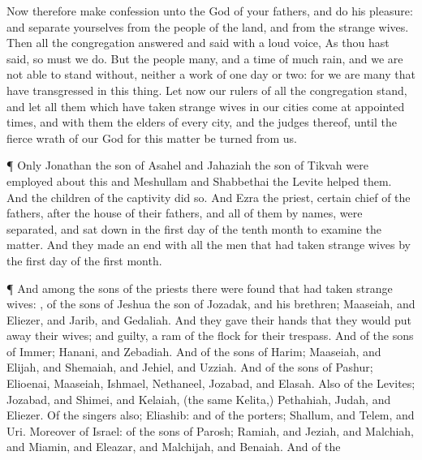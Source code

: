 {Now therefore
make
confession unto the
{}
God of your
fathers, and
do his
pleasure: and
separate yourselves from the
people of the
land, and from the
strange
wives.
Then all the
congregation
answered and
said with a
loud
voice, As thou hast
said, so must we
do.
But the
people
{}
many, and
{} a
time of much
rain, and we are not
able to
stand
without, neither
{} a
work of
one
day or
two: for we are
many that have
transgressed in this
thing.
Let now our
rulers of all the
congregation
stand, and let all them which have
taken
strange
wives in our
cities
come at
appointed
times, and with them the
elders of every
city, and the
judges thereof, until the
fierce
wrath of our
God for this
matter be
turned from us.
\par }{\PP {}¶ Only
Jonathan the
son of
Asahel and
Jahaziah the
son of
Tikvah were
employed about this
{} and
Meshullam and
Shabbethai the
Levite
helped them.
And the
children of the
captivity did
so. And
Ezra the
priest,
{}
certain
chief of the
fathers, after the
house of their
fathers, and all of them by
{}
names, were
separated, and sat
down in the
first
day of the
tenth
month to
examine the
matter.
And they made an
end with all the
men that had
taken
strange
wives by the
first
day of the
first
month.
\par }{\PP {}¶ And among the
sons of the
priests there were
found that had
taken
strange
wives:
{}, of the
sons of
Jeshua the
son of
Jozadak, and his
brethren;
Maaseiah, and
Eliezer, and
Jarib, and
Gedaliah.
And they
gave their
hands that they would put
away their
wives; and
{}
guilty,
{} a
ram of the
flock for their
trespass.
And of the
sons of
Immer;
Hanani, and
Zebadiah.
And of the
sons of
Harim;
Maaseiah, and
Elijah, and
Shemaiah, and
Jehiel, and
Uzziah.
And of the
sons of
Pashur;
Elioenai,
Maaseiah,
Ishmael,
Nethaneel,
Jozabad, and
Elasah.
Also of the
Levites;
Jozabad, and
Shimei, and
Kelaiah, (the same
{}
Kelita,)
Pethahiah,
Judah, and
Eliezer.
Of the
singers also;
Eliashib: and of the
porters;
Shallum, and
Telem, and
Uri.
Moreover of
Israel: of the
sons of
Parosh;
Ramiah, and
Jeziah, and
Malchiah, and
Miamin, and
Eleazar, and
Malchijah, and
Benaiah.
And of the
}
